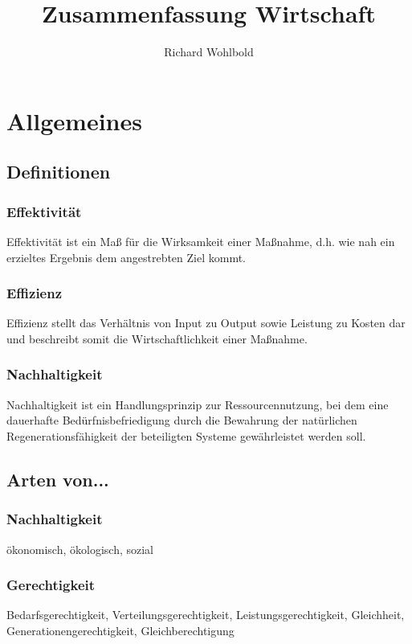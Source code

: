 \documentclass[titlepage,parskip=half]{scrartcl}
\title{Zusammenfassung Wirtschaft}
\author{Richard Wohlbold}
\let\Section\section
\renewcommand\section{\clearpage\Section}
\begin{document}
\maketitle
\setcounter{tocdepth}{2}
\tableofcontents
\clearpage

\section{Allgemeines}
\subsection{Definitionen}
\subsubsection{Effektivität}
Effektivität ist ein Maß für die Wirksamkeit einer Maßnahme, d.h. wie nah ein erzieltes Ergebnis dem angestrebten Ziel kommt.

\subsubsection{Effizienz}
Effizienz stellt das Verhältnis von Input zu Output sowie Leistung zu Kosten dar und beschreibt somit die Wirtschaftlichkeit einer Maßnahme.

\subsubsection{Nachhaltigkeit}
Nachhaltigkeit ist ein Handlungsprinzip zur Ressourcennutzung, bei dem eine dauerhafte Be\-dürf\-nis\-be\-frie\-di\-gung durch die Bewahrung der natürlichen Regenerationsfähigkeit der beteiligten Systeme gewährleistet werden soll.

\subsection{Arten von...}
\subsubsection{Nachhaltigkeit}
ökonomisch, ökologisch, sozial

\subsubsection{Gerechtigkeit}
Bedarfsgerechtigkeit, Verteilungsgerechtigkeit, Leistungsgerechtigkeit, Gleichheit, Generationengerechtigkeit, Gleichberechtigung
\end{document}
